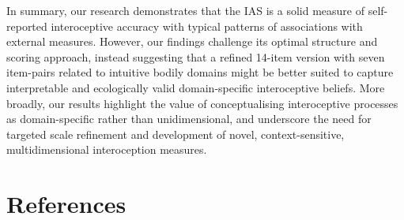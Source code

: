 \documentclass[
  jou,
  floatsintext,
  longtable,
  nolmodern,
  notxfonts,
  notimes,
  colorlinks=true,linkcolor=blue,citecolor=blue,urlcolor=blue]{apa7}
\begin{document}
In summary, our research demonstrates that the IAS is a solid measure of
self-reported interoceptive accuracy with typical patterns of
associations with external measures. However, our findings challenge its
optimal structure and scoring approach, instead suggesting that a
refined 14-item version with seven item-pairs related to intuitive
bodily domains might be better suited to capture interpretable and
ecologically valid domain-specific interoceptive beliefs. More broadly,
our results highlight the value of conceptualising interoceptive
processes as domain-specific rather than unidimensional, and underscore
the need for targeted scale refinement and development of novel,
context-sensitive, multidimensional interoception measures.

\section{References}\label{references}
\end{document}
